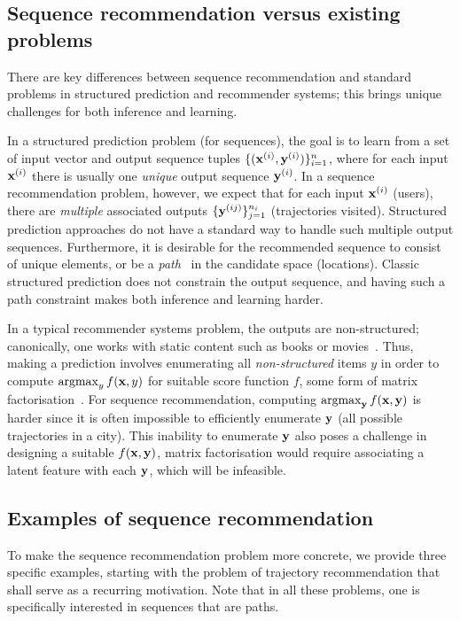 \secmoveup
\subsection{Sequence recommendation versus existing problems}

There are key differences between sequence recommendation and %
standard problems in structured prediction and recommender systems;
this brings unique challenges for both inference and learning.

In a structured prediction problem (for sequences), the goal is to learn from a set of
input vector and output sequence tuples
$\{ (\mathbf{x}^{({i})}, \mathbf{y}^{({i})}) \}_{i = 1}^n$, where
for each input $\mathbf{x}^{({i})}$ there is usually one \emph{unique} output sequence $\mathbf{y}^{({i})}$.
In a sequence recommendation problem, however, we expect that %
for each input $\mathbf{x}^{({i})}$ (\eg users),
there are \emph{multiple} associated outputs
$\{ \mathbf{y}^{({ij})} \}_{j=1}^{n_i}$ (\eg trajectories visited).
Structured prediction approaches do not have a standard way to handle such multiple output sequences.
Furthermore, it is desirable for the recommended sequence to consist of unique elements,
or be a {\em path}~\cite{west2001introduction} in the candidate space (\eg locations).
Classic structured prediction does not constrain the output sequence, and having such a
path constraint makes both inference and learning harder.

In a typical recommender systems problem, the outputs are non-structured; canonically, one works with {static} content such as books or movies~\citep{Goldberg:1992,Sarwar:2001,Netflix}.
Thus, making a prediction involves enumerating all {\em non-structured} items $y$ in order to compute $\operatorname*{argmax}_y f(\mathbf{x},y)$ for suitable score function $f$, \eg some form of matrix factorisation~\citep{Koren:2009}.
For sequence recommendation, computing $\operatorname*{argmax}_{\mathbf{y}} f(\mathbf{x},\mathbf{y})$ is harder since it is often impossible to efficiently enumerate $\mathbf{y}$ (\eg all possible trajectories in a city).
This inability to enumerate $\mathbf{y}$ also poses a challenge in designing a suitable $f(\mathbf{x},\mathbf{y})$,
\eg
matrix factorisation
would require associating a latent feature with each $\mathbf{y}$, which will be infeasible.


\secmoveup
\subsection{Examples of sequence recommendation}
\label{sec:trajrec}

To make the sequence recommendation problem more concrete,
we provide three specific examples,
starting with the problem of trajectory recommendation
that shall serve as a recurring motivation.
Note that in all these problems, one is specifically interested in sequences that are paths.


